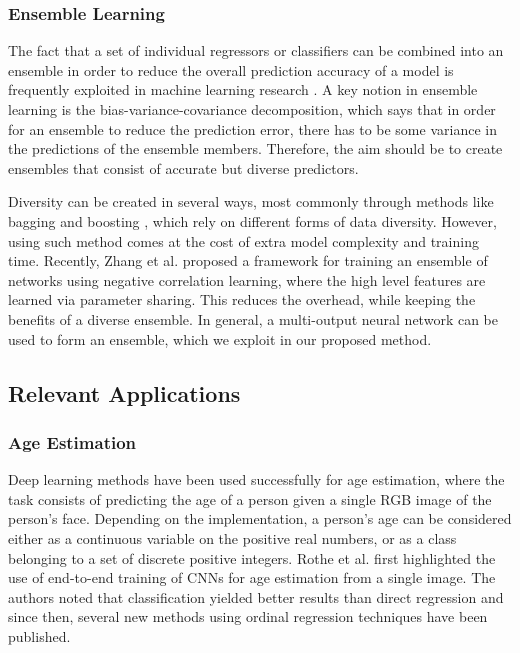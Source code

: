 \documentclass[10pt, conference, a4paper]{IEEEtran}
\begin{document}
\subsubsection{Ensemble Learning}
The fact that a set of individual regressors or classifiers can be combined into an ensemble in order to reduce the overall prediction accuracy of a model is frequently exploited in machine learning research \cite{ren2016ensemble}. A key notion in ensemble learning is the bias-variance-covariance decomposition, which says that in order for an ensemble to reduce the prediction error, there has to be some variance in the predictions of the ensemble members. Therefore, the aim should be to create ensembles that consist of accurate but diverse predictors.

Diversity can be created in several ways, most commonly through methods like bagging \cite{breiman1996bagging} and boosting \cite{freund1996experiments}, which rely on different forms of data diversity. However, using such method comes at the cost of extra model complexity and training time. Recently, Zhang et al.  \cite{zhang2019robust} proposed a framework for training an ensemble of networks using negative correlation learning, where the high level features are learned via parameter sharing. This reduces the overhead, while keeping the benefits of a diverse ensemble. In general, a multi-output neural network can be used to form an ensemble, which we exploit in our proposed method.

\subsection{Relevant Applications}
\subsubsection{Age Estimation}
Deep learning methods have been used successfully for age estimation, where the task consists of predicting the age of a person given a single RGB image of the person's face. Depending on the implementation, a person's age can be considered either as a continuous variable on the positive real numbers, or as a class belonging to a set of discrete positive integers. Rothe et al. \cite{rothe2015dex} first highlighted the use of end-to-end training of CNNs for age estimation from a single image. The authors noted that classification yielded better results than direct regression and since then, several new methods using ordinal regression techniques have been published. 
\end{document}

